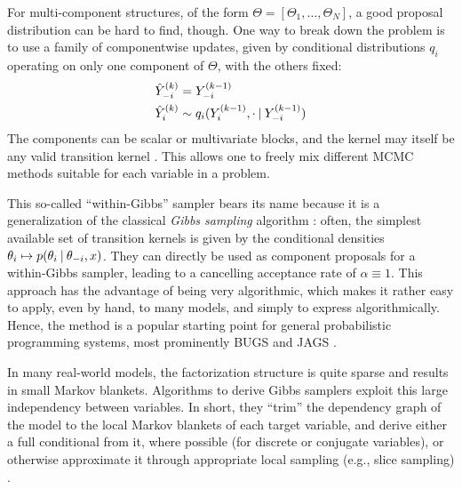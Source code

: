 For multi-component structures, of the form \(\Theta = [\Theta_1, \ldots, \Theta_N]\), a good
proposal distribution can be hard to find, though.  One way to break down the problem is to use a
family of componentwise updates, given by conditional distributions \(q_{i}\) operating on only one
component of \(\Theta\), with the others fixed:
\begin{equation}
  \label{eq:conditional-kernels}
  \begin{aligned}
    \kth[k]{\hat{Y}}_{-i} &= \kth[k-1]{Y}_{-i} \\
    \kth[k]{\hat{Y}}_{i} &\from q_{i}(\kth[k-1]{Y}_{i}, \cdot \given \kth[k-1]{Y}_{-i})
  \end{aligned}
\end{equation}
The components can be scalar or multivariate blocks, and the kernel may itself be any valid
transition kernel \parencite[chapter 6.6]{vihola2020lectures}.  This allows one to freely mix
different MCMC methods suitable for each variable in a problem.

This so-called \enquote{within-Gibbs} sampler bears its name because it is a generalization of the
classical \emph{Gibbs sampling} algorithm \parencite{geman1984stochastic}: often, the simplest
available set of transition kernels is given by the conditional densities
\(\theta_{i} \mapsto p(\theta_{i} \:\vert\: \theta_{-i}, x)\). They can directly be used as component
proposals for a within-Gibbs sampler, leading to a cancelling acceptance rate of
\(\alpha \equiv 1\).  This approach has the advantage of being very algorithmic, which makes it
rather easy to apply, even by hand, to many models, and simply to express algorithmically.  Hence,
the method is a popular starting point for general probabilistic programming systems, most
prominently BUGS \parencite{lunn2000winbugs,lunn2009bugs} and JAGS
\parencite{plummer2003jags,plummer2017jags}.

In many real-world models, the factorization structure is quite sparse and results in small Markov
blankets.  Algorithms to derive Gibbs samplers exploit this large independency between variables.
In short, they \enquote{trim} the dependency graph of the model to the local Markov blankets of each
target variable, and derive either a full conditional from it, where possible (for discrete or
conjugate variables), or otherwise approximate it through appropriate local sampling (e.g., slice
sampling) \parencite[see][]{plummer2003jags}.

